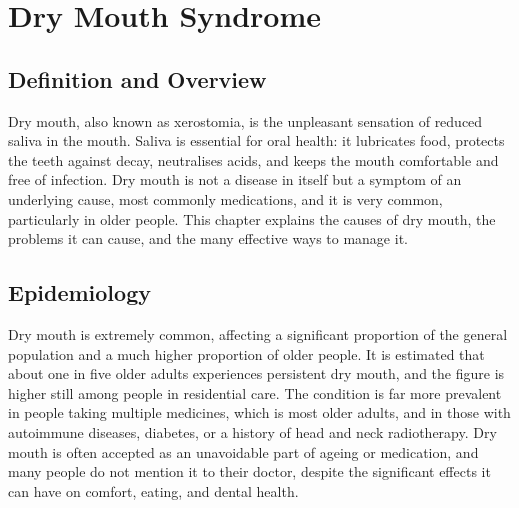 \chapter{Dry Mouth Syndrome}

\section*{Definition and Overview}
Dry mouth, also known as xerostomia, is the unpleasant sensation of reduced saliva in the mouth. Saliva is essential for oral health: it lubricates food, protects the teeth against decay, neutralises acids, and keeps the mouth comfortable and free of infection. Dry mouth is not a disease in itself but a symptom of an underlying cause, most commonly medications, and it is very common, particularly in older people. This chapter explains the causes of dry mouth, the problems it can cause, and the many effective ways to manage it.

\section*{Epidemiology}
Dry mouth is extremely common, affecting a significant proportion of the general population and a much higher proportion of older people. It is estimated that about one in five older adults experiences persistent dry mouth, and the figure is higher still among people in residential care. The condition is far more prevalent in people taking multiple medicines, which is most older adults, and in those with autoimmune diseases, diabetes, or a history of head and neck radiotherapy. Dry mouth is often accepted as an unavoidable part of ageing or medication, and many people do not mention it to their doctor, despite the significant effects it can have on comfort, eating, and dental health.


